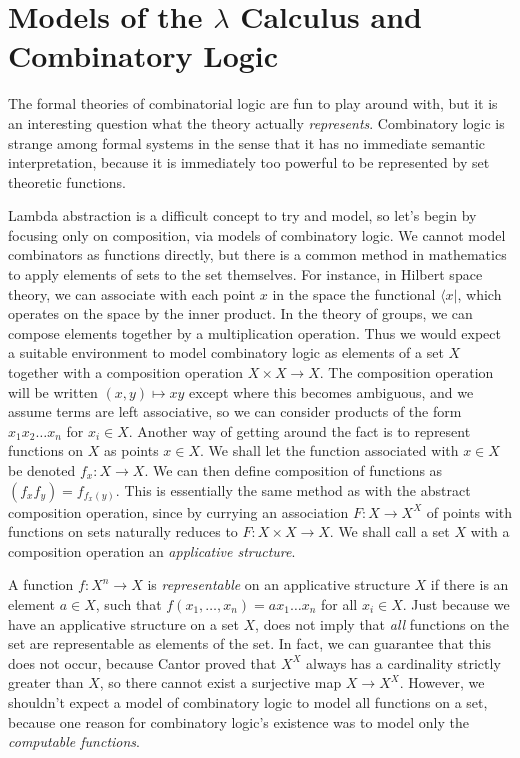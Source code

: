 \section{Models of the $\lambda$ Calculus and Combinatory Logic}

The formal theories of combinatorial logic are fun to play around with, but it is an interesting question what the theory actually {\it represents}. Combinatory logic is strange among formal systems in the sense that it has no immediate semantic interpretation, because it is immediately too powerful to be represented by set theoretic functions.

Lambda abstraction is a difficult concept to try and model, so let's begin by focusing only on composition, via models of combinatory logic. We cannot model combinators as functions directly, but there is a common method in mathematics to apply elements of sets to the set themselves. For instance, in Hilbert space theory, we can associate with each point $x$ in the space the functional $\langle x |$, which operates on the space by the inner product. In the theory of groups, we can compose elements together by a multiplication operation. Thus we would expect a suitable environment to model combinatory logic as elements of a set $X$ together with a composition operation $X \times X \to X$. The composition operation will be written $(x,y) \mapsto xy$ except where this becomes ambiguous, and we assume terms are left associative, so we can consider products of the form $x_1 x_2 \dots x_n$ for $x_i \in X$. Another way of getting around the fact is to represent functions on $X$ as points $x \in X$. We shall let the function associated with $x \in X$ be denoted $f_x : X \to X$. We can then define composition of functions as $(f_x f_y) = f_{f_x(y)}$. This is essentially the same method as with the abstract composition operation, since by currying an association $F: X \to X^X$ of points with functions on sets naturally reduces to $F: X \times X \to X$. We shall call a set $X$ with a composition operation an \emph{applicative structure}.

A function $f: X^n \to X$ is \emph{representable} on an applicative structure $X$ if there is an element $a \in X$, such that $f(x_1, \dots, x_n) = ax_1 \dots x_n$ for all $x_i \in X$. Just because we have an applicative structure on a set $X$, does not imply that {\it all} functions on the set are representable as elements of the set. In fact, we can guarantee that this does not occur, because Cantor proved that $X^X$ always has a cardinality strictly greater than $X$, so there cannot exist a surjective map $X \to X^X$. However, we shouldn't expect a model of combinatory logic to model all functions on a set, because one reason for combinatory logic's existence was to model only the {\it computable functions}.

